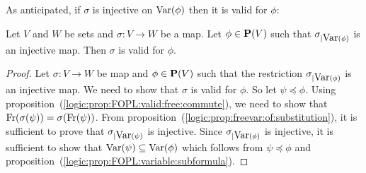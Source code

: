 As anticipated, if $\sigma$ is injective on $\mbox{\rm Var}(\phi)$ then it is
valid for $\phi$:

\begin{prop}\label{logic:prop:FOPL:valid:injective}
Let $V$ and $W$ be sets and $\sigma:V\to W$ be a map. Let
$\phi\in\mbox{${\bf P}(V)$}$ such that $\sigma_{|\mbox{\rm Var}(\phi)}$ is an injective map.
Then $\sigma$ is valid for $\phi$.
\end{prop}
\begin{proof}
Let $\sigma:V\to W$ be map and $\phi\in\mbox{${\bf P}(V)$}$ such that the
restriction $\sigma_{|\mbox{\rm Var}(\phi)}$ is an injective map. We need to
show that $\sigma$ is valid for $\phi$. So let $\psi\preceq\phi$.
Using proposition~(\ref{logic:prop:FOPL:valid:free:commute}), we
need to show that $\mbox{\rm Fr}(\sigma(\psi)) =\sigma(\mbox{\rm Fr}(\psi))$. From
proposition~(\ref{logic:prop:freevar:of:substitution}), it is
sufficient to prove that $\sigma_{|\mbox{\rm Var}(\psi)}$ is injective. Since
$\sigma_{|\mbox{\rm Var}(\phi)}$ is injective, it is sufficient to show that
$\mbox{\rm Var}(\psi)\subseteq\mbox{\rm Var}(\phi)$ which follows from $\psi\preceq\phi$
and proposition~(\ref{logic:prop:FOPL:variable:subformula}).
\end{proof}


